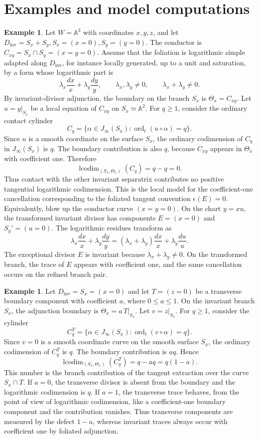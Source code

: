 \documentclass[11pt]{amsart}
\numberwithin{equation}{section}
\theoremstyle{plain}
\theoremstyle{definition}
\newtheorem{Example}[Theorem]{Example}
\newcommand{\ord}{\operatorname{ord}}
\newcommand{\lcodim}{\operatorname{lcodim}}
\newcommand{\Dinv}{D_{\mathrm{inv}}}
\begin{document}
\section{Examples and model computations}
\label{sec:examples}

\begin{Example}
Let $W=\mathbb A^3$ with coordinates $x,y,z$, and let
$
\Dinv=S_x+S_y,
S_x=(x=0),
S_y=(y=0).$
The conductor is
$
C_{xy}=S_x\cap S_y=(x=y=0).
$
Assume that the foliation is logarithmic simple adapted along $\Dinv$,
for instance locally generated, up to a unit and saturation, by a form whose
logarithmic part is
\[
\lambda_x\frac{dx}{x}+\lambda_y\frac{dy}{y},
\qquad
\lambda_x,\lambda_y\ne 0,
\qquad
\lambda_x+\lambda_y\ne 0.
\]
By invariant-divisor adjunction, the boundary on the branch $S_x$ is
$
\Theta_x=C_{xy}.$
Let $u=y|_{S_x}$ be a local equation of $C_{xy}$ on $S_x\simeq\mathbb A^2$.
For $q\geq 1$, consider the ordinary contact cylinder
\[
C_q=\{\alpha\in J_\infty(S_x):\ord_t(u\circ\alpha)=q\}.
\]
Since $u$ is a smooth coordinate on the surface $S_x$, the ordinary
codimension of $C_q$ in $J_\infty(S_x)$ is $q$. The boundary contribution is
also $q$, because $C_{xy}$ appears in $\Theta_x$ with coefficient one.
Therefore
\[
\lcodim_{(S_x,\Theta_x)}(C_q)=q-q=0.
\]
Thus contact with the other invariant separatrix contributes no positive
tangential logarithmic codimension. This is the local model for the coefficient-one
cancellation corresponding to the foliated tangent convention
$\epsilon(E)=0$.
Equivalently, blow up the conductor curve $(x=y=0)$. On the chart $y=xu$,
the transformed invariant divisor has components
$
E=(x=0)$ and $
S_y'=(u=0).
$ The logarithmic residues transform as
\[
\lambda_x\frac{dx}{x}+\lambda_y\frac{dy}{y}
=
(\lambda_x+\lambda_y)\frac{dx}{x}
+
\lambda_y\frac{du}{u}.
\]
The exceptional divisor $E$ is invariant because
$\lambda_x+\lambda_y\ne 0$. On the transformed branch, the trace of $E$
appears with coefficient one, and the same cancellation occurs on the
refined branch pair.
\end{Example}

\begin{Example}
Let
$
\Dinv=S_x=(x=0)
$
and let
$
T=(z=0)
$
be a transverse boundary component with coefficient $a$, where $0\leq a\leq
1$. On the invariant branch $S_x$, the adjunction boundary is
$
\Theta_x=a\,T|_{S_x}.
$
Let $v=z|_{S_x}$. For $q\geq 1$, consider the cylinder
\[
C_q^T=\{\alpha\in J_\infty(S_x):\ord_t(v\circ\alpha)=q\}.
\]
Since $v=0$ is a smooth coordinate curve on the smooth surface $S_x$, the
ordinary codimension of $C_q^T$ is $q$. The boundary contribution is $aq$.
Hence
\[
\lcodim_{(S_x,\Theta_x)}(C_q^T)=q-aq=q(1-a).
\]
This number is the branch contribution of the tangent
extraction over the curve $S_x\cap T$.
If $a=0$, the transverse divisor is absent from the boundary and the
logarithmic codimension is $q$. If $a=1$, the transverse trace behaves, from the
point of view of logarithmic codimension, like a coefficient-one boundary component
and the contribution vanishes. Thus transverse components are measured by
the defect $1-a$, whereas invariant traces always occur with coefficient
one by foliated adjunction.
\end{Example}
\end{document}
